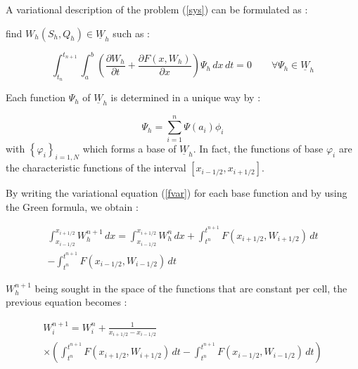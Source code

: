 \vspace{0.5cm}

A variational description of the problem (\ref{sys}) can be formulated as :

find $W_h(S_h,Q_h) \in \underline{W}_h$ such as :

\begin{equation}
 \label{fvar}
 \int_{t_n}^{t_{n+1}} \int_{a}^{b} \left ( \frac{\partial W_h}{\partial t} + \frac{\partial F(x,W_h)}{\partial x} \right ) \Psi_h \, dx \, dt = 0 \qquad \forall \Psi_h \in \underline{W}_h
\end{equation}

\vspace{0.5cm}

Each function $\Psi_h$ of $\underline{W}_h$ is determined in a unique way by : 

\begin{equation}
 \Psi_h = \sum_{i=1}^n \Psi (a_i)\phi_i
\end{equation}
with $\left \lbrace \varphi_i\right \rbrace_{i=1,N}$ which forms a base of $\underline{W}_h$. In fact, the functions of base $\varphi_i$ are the characteristic functions of the interval $[x_{i-1/2},x_{i+1/2}]$.

\vspace{0.5cm}

By writing the variational equation (\ref{fvar}) for each base function and by using the Green formula, we obtain :

\begin{eqnarray}
 & \int_{x_{i-1/2}}^{x_{i+1/2}} W_{h}^{n+1}\, dx = \int_{x_{i-1/2}}^{x_{i+1/2}} W_{h}^{n}\, dx + \int_{t^n}^{t^{n+1}} F(x_{i+1/2},W_{i+1/2}) \, dt  &         \nonumber \\
 & - \int_{t^n}^{t^{n+1}} F(x_{i-1/2},W_{i-1/2}) \, dt &
\end{eqnarray}

\vspace{0.5cm}

$W_{h}^{n+1}$ being sought in the space of the functions that are constant per cell, the previous equation becomes :

\begin{eqnarray}
 & W_{i}^{n+1} = W_{i}^n + \frac{1}{x_{i+1/2}-x_{i-1/2}} & \nonumber \\
 & \times \left ( \int_{t^n}^{t^{n+1}} F(x_{i+1/2},W_{i+1/2}) \, dt - \int_{t^n}^{t^{n+1}} F(x_{i-1/2},W_{i-1/2}) \, dt \right ) &
\end{eqnarray}


